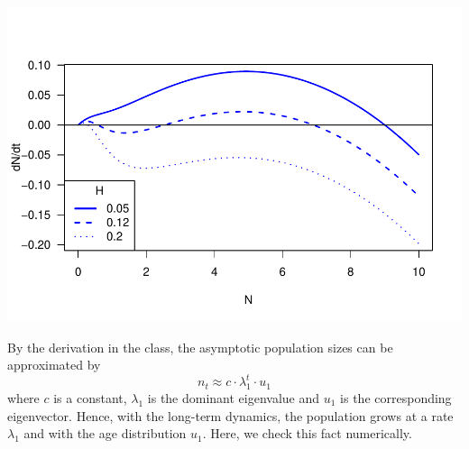 \documentclass[
]{book}
\newenvironment{Shaded}{\begin{snugshade}}{\end{snugshade}}
\newcommand{\AttributeTok}[1]{\textcolor[rgb]{0.13,0.29,0.53}{#1}}
\newcommand{\DecValTok}[1]{\textcolor[rgb]{0.00,0.00,0.81}{#1}}
\newcommand{\FunctionTok}[1]{\textcolor[rgb]{0.13,0.29,0.53}{\textbf{#1}}}
\newcommand{\NormalTok}[1]{#1}
\newcommand{\SpecialCharTok}[1]{\textcolor[rgb]{0.81,0.36,0.00}{\textbf{#1}}}
\newcommand{\StringTok}[1]{\textcolor[rgb]{0.31,0.60,0.02}{#1}}
\begin{document}
\begin{Shaded}
\end{Shaded}

\includegraphics{bookdown-demo_files/figure-latex/unnamed-chunk-18-1.pdf}

By the derivation in the class, the asymptotic population sizes can be approximated by
\[
n_t \approx c\cdot \lambda_1^t\cdot u_1
\]
where \(c\) is a constant, \(\lambda_1\) is the dominant eigenvalue and \(u_1\) is the corresponding eigenvector. Hence, with the long-term dynamics, the population grows at a rate \(\lambda_1\) and with the age distribution \(u_1\). Here, we check this fact numerically.
\end{document}
